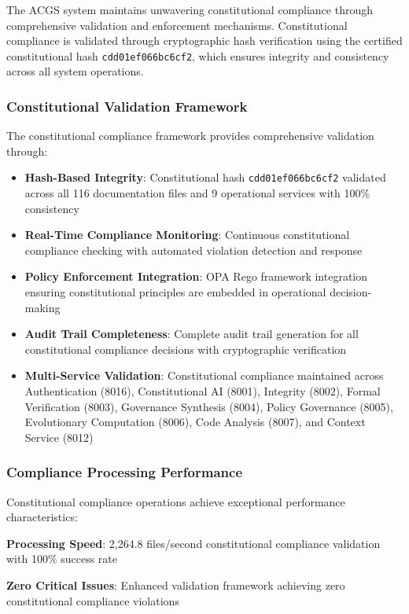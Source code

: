 The ACGS system maintains unwavering constitutional compliance through comprehensive validation and enforcement mechanisms. Constitutional compliance is validated through cryptographic hash verification using the certified constitutional hash \texttt{cdd01ef066bc6cf2}, which ensures integrity and consistency across all system operations.

\subsubsection{Constitutional Validation Framework}
The constitutional compliance framework provides comprehensive validation through:

\begin{itemize}[leftmargin=*,itemsep=2pt,parsep=1pt]
    \item \textbf{Hash-Based Integrity}: Constitutional hash \texttt{cdd01ef066bc6cf2} validated across all 116 documentation files and 9 operational services with 100\% consistency
    \item \textbf{Real-Time Compliance Monitoring}: Continuous constitutional compliance checking with automated violation detection and response
    \item \textbf{Policy Enforcement Integration}: OPA Rego framework integration ensuring constitutional principles are embedded in operational decision-making
    \item \textbf{Audit Trail Completeness}: Complete audit trail generation for all constitutional compliance decisions with cryptographic verification
    \item \textbf{Multi-Service Validation}: Constitutional compliance maintained across Authentication (8016), Constitutional AI (8001), Integrity (8002), Formal Verification (8003), Governance Synthesis (8004), Policy Governance (8005), Evolutionary Computation (8006), Code Analysis (8007), and Context Service (8012)
\end{itemize}

\subsubsection{Compliance Processing Performance}
Constitutional compliance operations achieve exceptional performance characteristics:

\noindent\textbf{Processing Speed}: 2,264.8 files/second constitutional compliance validation with 100\% success rate

\noindent\textbf{Zero Critical Issues}: Enhanced validation framework achieving zero constitutional compliance violations

